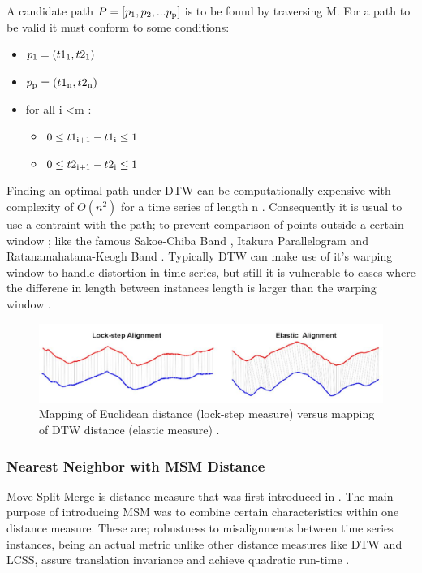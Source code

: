 A candidate path $P = [p\textsubscript{1},p\textsubscript{2},...p\textsubscript{p}]$ is to be found by traversing M.
For a path to be valid it must conform to some conditions:
\begin{itemize}
    \item $p\textsubscript{1} = (t1\textsubscript{1},t2\textsubscript{1})$
    \item $p\textsubscript{p} = (t1\textsubscript{n},t2\textsubscript{n})$
    \item for all i \textless m :
        \begin{itemize}
            \item $0 \leq t1\textsubscript{i+1} - t1\textsubscript{i} \leq 1$
            \item $0 \leq t2\textsubscript{i+1} - t2\textsubscript{i} \leq 1$
        \end{itemize}
\end{itemize}

Finding an optimal path under DTW can be computationally expensive with complexity of $O(n^2)$ for a time series of length n \cite{schafer2017fast,petitjean2016faster}.
Consequently it is usual to use a contraint with the path; to prevent comparison of points outside a certain window \cite{tan2020fastee}; like the famous Sakoe-Chiba Band \cite{sakoe1978dynamic}, Itakura Parallelogram \cite{itakura1975minimum} and Ratanamahatana-Keogh Band \cite{ratanamahatana2004making}.
Typically DTW can make use of it's warping window to handle distortion in time series,
but still it is vulnerable to cases where the differene in length between instances length is larger than the warping window \cite{tan2019time}.

\begin{figure}
    \captionsetup{justification=raggedright}
    \centering
    \includegraphics[scale = 0.5]{ED_vs_DTW.JPG}
    \centering
    \caption{Mapping of Euclidean distance (lock-step measure) versus mapping of DTW distance (elastic measure) \cite{abanda2019review}.}
    \label{Img:ED_vs_DTW}
\end{figure}

\subsubsection{Nearest Neighbor with MSM Distance}
Move-Split-Merge is distance measure that was first introduced in \cite{stefan2012move}.
The main purpose of introducing MSM was to combine certain characteristics within one distance measure.
These are; robustness to misalignments between time series instances, being an actual metric unlike other distance measures like DTW and LCSS,
assure translation invariance and achieve quadratic run-time \cite{lines2015time}.

